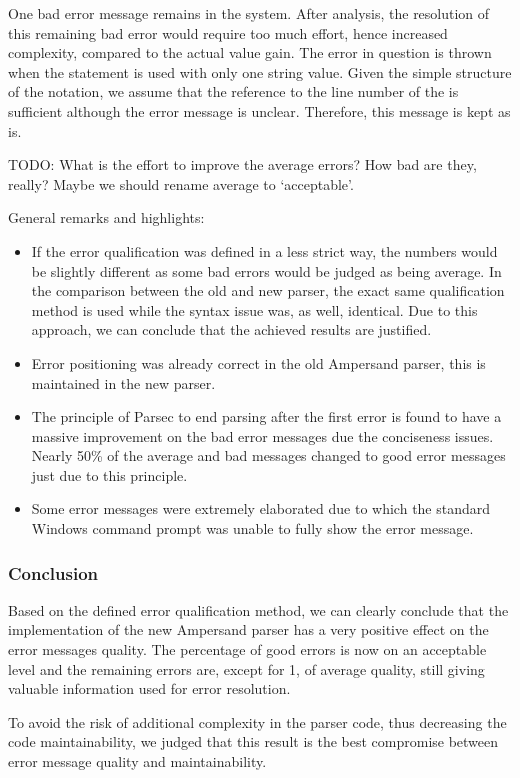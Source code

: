 One bad error message remains in the system.
After analysis, the resolution of this remaining bad error would require too much effort, hence increased complexity, compared to the actual value gain.
The error in question is thrown when the  statement is used with only one string value. 
Given the simple structure of the notation, we assume that the reference to the line number of the  is sufficient although the error message is unclear.
Therefore, this message is kept as is.


TODO: What is the effort to improve the average errors? How bad are they, really? Maybe we should rename average to `acceptable'.

General remarks and highlights:
 \begin{itemize}
	\item 	If the error qualification was defined in a less strict way, the numbers would be slightly different as some bad errors would be judged as being average. 
		In the comparison between the old and new parser, the exact same qualification method is used while the syntax issue was, as well, identical.
		Due to this approach, we can conclude that the achieved results are justified.
	\item 	Error positioning was already correct in the old Ampersand parser, this is maintained in the new parser.
	\item 	The principle of Parsec to end parsing after the first error is found to have a massive improvement on the bad error messages due the conciseness issues.
		Nearly 50\% of the average and bad messages changed to good error messages just due to this principle.
	\item 	Some error messages were extremely elaborated due to which the standard Windows command prompt was unable to fully show the error message.
\end {itemize}

\subsubsection{Conclusion}
Based on the defined error qualification method, we can clearly conclude that the implementation of the new Ampersand parser has a very positive effect on the error messages quality.
The percentage of good errors is now on an acceptable level and the remaining errors are, except for 1, of average quality, still giving valuable information used for error resolution.

To avoid the risk of additional complexity in the parser code, thus decreasing the code maintainability, we judged that this result is  the best compromise between error message quality and maintainability.
